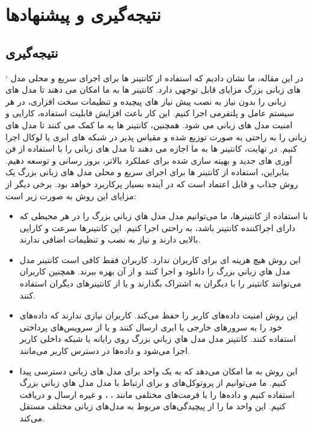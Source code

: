 
\chapter{نتیجه‌گیری و پیشنهادها}
\section{‌نتیجه‌گیری}
`
در این مقاله، ما نشان دادیم که استفاده از کانتینر ها برای اجرای سریع و محلی مدل های زبانی بزرگ مزایای قابل توجهی دارد. کانتینر ها به ما امکان می دهند تا مدل های زبانی را بدون نیاز به نصب پیش نیاز های پیچیده و تنظیمات سخت افزاری، در هر سیستم عامل و پلتفرمی اجرا کنیم. این کار باعث افزایش قابلیت استفاده، کارایی و امنیت مدل های زبانی می شود. همچنین، کانتینر ها به ما کمک می کنند تا مدل های زبانی را به راحتی به صورت توزیع شده و مقیاس پذیر در شبکه های ابری یا لوکال اجرا کنیم. در نهایت، کانتینر ها به ما اجازه می دهند تا مدل های زبانی را با استفاده از فن آوری های جدید و بهینه سازی شده برای عملکرد بالاتر، بروز رسانی و توسعه دهیم. بنابراین، استفاده از کانتینر ها برای اجرای سریع و محلی مدل های زبانی بزرگ یک روش جذاب و قابل اعتماد است که در آینده بسیار پرکاربرد خواهد بود.
برخی دیگر از مزایای این روش به صورت زیر است:
\begin{itemize}[label=-]
  \item
با استفاده از کانتینرها، ما می‌توانیم مدل مدل ﻫﺎﻱ ﺯﺑﺎﻧﻲ ﺑﺰﺭگ  را در هر محیطی که دارای اجراکننده کانتینر باشد، به راحتی اجرا کنیم. این کانتینرها سرعت و کارایی بالایی دارند و نیاز به نصب و تنظیمات اضافی ندارند.
\item
این روش هیچ هزینه ای برای کاربران ندارد. کاربران فقط کافی است کانتینر مدل مدل ﻫﺎﻱ ﺯﺑﺎﻧﻲ ﺑﺰﺭگ  را دانلود و اجرا کنند و از آن بهره ببرند. همچنین کاربران می‌توانند کانتینر را با دیگران به اشتراک بگذارند و یا از کانتینرهای دیگران استفاده کنند.
\item
این روش امنیت داده‌های کاربر را حفظ می‌کند. کاربران نیازی ندارند که داده‌های خود را به سرورهای خارجی یا ابری ارسال کنند و یا از سرویس‌های پرداختی استفاده کنند. کانتینر مدل مدل ﻫﺎﻱ ﺯﺑﺎﻧﻲ ﺑﺰﺭگ  روی رایانه یا شبکه داخلی کاربر اجرا می‌شود و داده‌ها در دسترس کاربر می‌مانند.
\item
این روش به ما امکان می‌دهد که به یک  واحد برای مدل های زبانی دسترسی پیدا کنیم. ما می‌توانیم از پروتوکل‌های  و  برای ارتباط با مدل مدل ﻫﺎﻱ ﺯﺑﺎﻧﻲ ﺑﺰﺭگ  استفاده کنیم و داده‌ها را با فرمت‌های مختلفی مانند ، ،  و غیره ارسال و دریافت کنیم. این  واحد ما را از پیچیدگی‌های مربوط به مدل‌های زبانی مختلف مستقل می‌کند.
\end{itemize}
